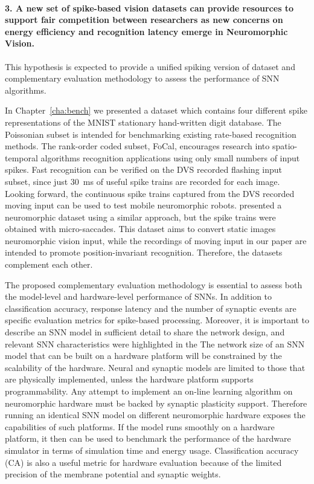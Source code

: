 \paragraph{3. A new set of spike-based vision datasets can provide resources to support fair competition between researchers as new concerns on energy efficiency and recognition latency emerge in Neuromorphic Vision.}
This hypothesis is expected to provide a unified spiking version of \protect{} \protect{} dataset and \protect{} complementary evaluation methodology to assess the performance of SNN algorithms.

In Chapter~\ref{cha:bench} we presented a dataset which contains four different spike representations of the MNIST stationary hand-written digit database. The Poissonian subset is intended for benchmarking existing rate-based recognition methods.
The rank-order coded subset, FoCal, encourages research into spatio-temporal algorithms \protect{} \protect{} recognition applications using only small numbers of input spikes.
Fast recognition can be verified on the DVS recorded flashing input subset, since just 30~ms of useful spike trains are recorded for each image.
Looking forward, the continuous spike trains captured from the DVS recorded moving input can be used to test mobile neuromorphic robots.
\protect{}
\citet{orchard2015convert} presented a neuromorphic dataset using a similar approach, but the spike trains were obtained with micro-saccades.
This dataset aims to convert static images \protect{} \protect{} neuromorphic vision input, while the recordings of moving input in our paper are intended to promote position-invariant recognition.
Therefore, the datasets complement each other.

The proposed complementary evaluation methodology is essential to assess both the model-level and hardware-level performance of SNNs.
In addition to classification accuracy, response latency and the number of synaptic events are specific evaluation metrics for spike-based processing.
Moreover, it is important to describe an SNN model in sufficient detail to share the network design, and relevant SNN characteristics were highlighted in the \protect{} \protect{}  
The network size of an SNN model that can be built on a hardware platform will be constrained by the scalability of the hardware.
Neural and synaptic models are limited to those that are physically implemented, unless the hardware platform supports programmability.
Any attempt to implement an on-line learning algorithm on neuromorphic hardware must be backed by synaptic plasticity support.
Therefore running an identical SNN model on different neuromorphic hardware exposes the capabilities of such platforms.
If the model runs smoothly on a hardware platform, it then can be used to benchmark the performance of the hardware simulator in terms of simulation time and energy usage.
Classification accuracy (CA) is also a useful metric for hardware evaluation because of the limited precision of the membrane potential and synaptic weights.


